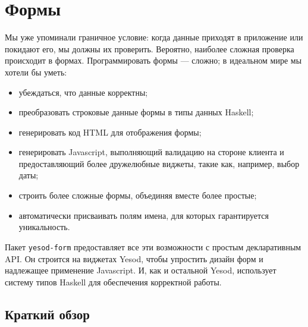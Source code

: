 \chapter{Формы}

Мы уже упоминали граничное условие: когда данные приходят в приложение или покидают его,
мы должны их проверить. Вероятно, наиболее сложная проверка происходит в формах.
Программировать формы --- сложно; в идеальном мире мы хотели бы уметь:

\begin{itemize}
\item убеждаться, что данные корректны;
\item преобразовать строковые данные формы в типы данных Haskell; %
\item генерировать код HTML для отображения формы;
\item генерировать Javascript, выполняющий валидацию на стороне клиента и предоставляющий
более дружелюбные виджеты, такие как, например, выбор даты;
\item строить более сложные формы, объединяя вместе более простые;
\item автоматически присваивать полям имена, для которых гарантируется уникальность.
\end{itemize}

Пакет \lstinline'yesod-form' предоставляет все эти возможности с простым декларативным
API. Он строится на виджетах Yesod, чтобы упростить дизайн форм и надлежащее применение
Javascript. И, как и остальной Yesod, использует систему типов Haskell для обеспечения
корректной работы.

\section{Краткий обзор}

